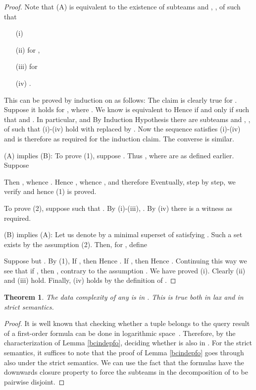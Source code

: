 \documentclass{article}
\theoremstyle{plain}
\newtheorem{theorem}{Theorem}
\theoremstyle{definition}
\begin{document}
\begin{proof} Note that (A) is equivalent to the existence of subteams  and , , of  such that 

\begin{enumerate}
\item[(i)] 
\item[(ii)]  for ,
\item[(iii)]  for 
\item [(iv)] .
\end{enumerate}
This can be proved by induction on  as follows: The claim is clearly true for . Suppose it holds for , where . We know  is equivalent to  Hence  if and only if  such that  and . In particular,  and 
By Induction Hypothesis there are subteams  and , , of  such that (i)-(iv) hold with  replaced by .
Now the sequence  satisfies (i)-(iv) and is therefore as required for the induction claim. The converse is similar.

(A) implies (B): To prove (1), suppose . Thus , where  are as defined earlier. Suppose  

 Then , whence . Hence , whence , and therefore   Eventually, step by step, we verify  and hence
 (1) is proved. 
 
 To prove (2), suppose  such that . By (i)-(iii), . By (iv) there is a witness as required.
 
 (B) implies (A): Let us denote by  a minimal superset of    satisfying   . Such a set  exists by the assumption (2). Then, for , define
 
 Suppose  but . By (1),  If , then  
  Hence .
 If , then 
  Hence 
 . Continuing this way we see that if , then , contrary to the assumption  . We have proved (i). Clearly (ii) and  (iii) hold. Finally, (iv) holds by the definition of .
\end{proof}









\begin{theorem}\label{BC(top,FO)} The data complexity of any  is in . This is true both in lax and in strict semantics.\end{theorem}
\begin{proof}
It is well known that checking whether a tuple  belongs to the query result  of a first-order formula can be done in logarithmic space~\cite{Immerman99}.  Therefore, by the characterization of Lemma \ref{bcindepfo}, deciding whether  is also in .
For the strict semantics, it suffices to note that the proof of Lemma \ref{bcindepfo}  goes through  also under the strict semantics. We can use the fact that the formulas  have the downwards closure property to force the  subteams  in the decomposition of  to be pairwise disjoint.
\end{proof}
\end{document}
